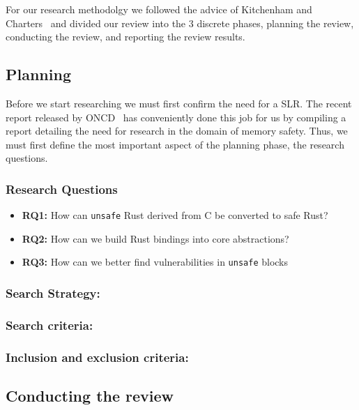 \documentclass[sigconf]{acmart}
\begin{document}
For our research methodolgy we followed the advice of Kitchenham and Charters~\cite{Stuart2007-cc}
and divided our review into the 3 discrete phases, planning the review, conducting the review, and
reporting the review results.

\subsection{Planning}

Before we start researching we must first confirm the need for a SLR. The recent report released by
ONCD~\cite{United_States_Gov2024-pp} has conveniently done this job for us by compiling a report
detailing the need for research in the domain of memory safety. Thus, we must first define the most
important aspect of the planning phase, the research questions.


\subsubsection{Research Questions}

\begin{itemize}
    \item \textbf{RQ1:} How can \lstinline{unsafe} Rust derived from C be converted to safe Rust?
    \item \textbf{RQ2:} How can we build Rust bindings into core abstractions?
    \item \textbf{RQ3:} How can we better find vulnerabilities in \lstinline{unsafe} blocks
\end{itemize}

\subsubsection{Search Strategy:}

\subsubsection{Search criteria:}

\subsubsection{Inclusion and exclusion criteria:}

\subsection{Conducting the review}
\end{document}
